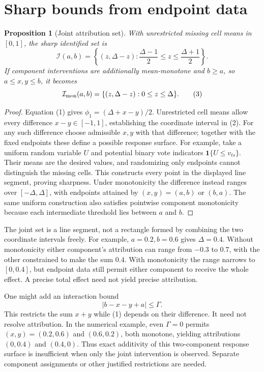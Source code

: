 \documentclass[11pt,a4paper]{article}
\newtheorem{proposition}[theorem]{Proposition}
\newcommand{\ind}{\mathbf1}
\begin{document}
\section{Sharp bounds from endpoint data}
\begin{proposition}[Joint attribution set]
With unrestricted missing cell means in $[0,1]$, the sharp identified set is
\[
 \mathcal I(a,b)=\left\{(z,\Delta-z):
            \frac{\Delta-1}{2}\le z\le\frac{\Delta+1}{2}\right\}. \tag{2}
\]
If component interventions are additionally mean-monotone and $b\ge a$, so $a\le x,y\le b$, it becomes
\[
 \mathcal I_{\rm mon}(a,b)
      =\{(z,\Delta-z):0\le z\le\Delta\}.             \tag{3}
\]
\end{proposition}
\begin{proof}
Equation (1) gives $\phi_1=(\Delta+x-y)/2$. Unrestricted cell means allow every difference $x-y\in[-1,1]$, establishing the coordinate interval in (2). For any such difference choose admissible $x,y$ with that difference; together with the fixed endpoints these define a possible response surface. For example, take a uniform random variable $U$ and potential binary vote indicators $\ind\{U\le v_{ts}\}$. Their means are the desired values, and randomizing only endpoints cannot distinguish the missing cells. This constructs every point in the displayed line segment, proving sharpness. Under monotonicity the difference instead ranges over $[-\Delta,\Delta]$, with endpoints attained by $(x,y)=(a,b)$ or $(b,a)$. The same uniform construction also satisfies pointwise component monotonicity because each intermediate threshold lies between $a$ and $b$.
\end{proof}

The joint set is a line segment, not a rectangle formed by combining the two coordinate intervals freely. For example, $a=0.2,b=0.6$ gives $\Delta=0.4$. Without monotonicity either component's attribution can range from $-0.3$ to $0.7$, with the other constrained to make the sum $0.4$. With monotonicity the range narrows to $[0,0.4]$, but endpoint data still permit either component to receive the whole effect. A precise total effect need not yield precise attribution.

One might add an interaction bound
\[
 |b-x-y+a|\le\Gamma.                                \tag{4}
\]
This restricts the sum $x+y$ while (1) depends on their difference. It need not resolve attribution. In the numerical example, even $\Gamma=0$ permits $(x,y)=(0.2,0.6)$ and $(0.6,0.2)$, both monotone, yielding attributions $(0,0.4)$ and $(0.4,0)$. Thus exact additivity of this two-component response surface is insufficient when only the joint intervention is observed. Separate component assignments or other justified restrictions are needed.
\end{document}
